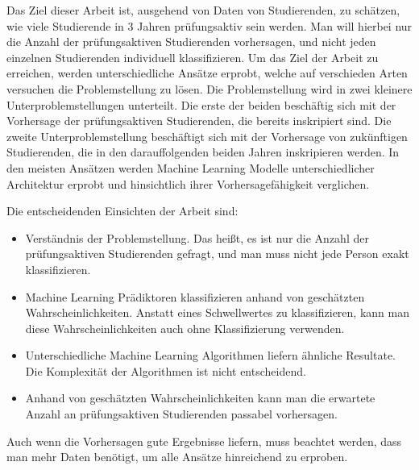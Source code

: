 
Das Ziel dieser Arbeit ist, ausgehend von Daten von Studierenden, zu sch\"atzen, wie viele
Studierende in 3 Jahren pr\"ufungsaktiv sein werden. Man will hierbei nur die Anzahl der pr\"ufungsaktiven Studierenden vorhersagen,
und nicht jeden einzelnen Studierenden individuell klassifizieren.
Um das Ziel der Arbeit zu erreichen, werden unterschiedliche Ans\"atze erprobt, welche auf verschieden Arten versuchen die Problemstellung zu l\"osen.
Die Problemstellung wird in zwei kleinere Unterproblemstellungen unterteilt. Die erste der beiden besch\"aftig sich mit der Vorhersage der pr\"ufungsaktiven Studierenden,
die bereits inskripiert sind. Die zweite Unterproblemstellung besch\"aftigt sich mit der Vorhersage von zuk\"unftigen Studierenden, die in den darauffolgenden beiden Jahren inskripieren werden.
In den meisten Ans\"atzen werden Machine Learning Modelle unterschiedlicher Architektur erprobt und hinsichtlich ihrer Vorhersagef\"ahigkeit
verglichen.

Die entscheidenden Einsichten der Arbeit sind:
\begin{itemize}
    \item Verst\"andnis der Problemstellung. Das hei{\ss}t, es ist nur die Anzahl der pr\"ufungsaktiven Studierenden gefragt, und man muss nicht jede Person exakt klassifizieren.
    \item Machine Learning Pr\"adiktoren klassifizieren anhand von gesch\"atzten Wahrscheinlichkeiten. Anstatt eines Schwellwertes zu klassifizieren,
          kann man diese Wahrscheinlichkeiten auch ohne Klassifizierung verwenden.
    \item Unterschiedliche Machine Learning Algorithmen liefern \"ahnliche Resultate. Die Komplexit\"at der Algorithmen ist nicht entscheidend.
    \item Anhand von gesch\"atzten Wahrscheinlichkeiten kann man die erwartete Anzahl an pr\"ufungsaktiven Studierenden passabel vorhersagen.
\end{itemize}

Auch wenn die Vorhersagen gute Ergebnisse liefern, muss beachtet werden, dass man mehr Daten ben\"otigt, um alle Ans\"atze hinreichend zu erproben.

